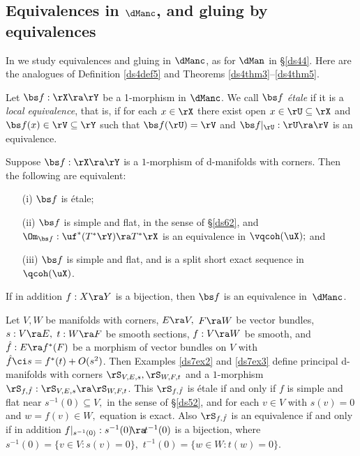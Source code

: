 \documentclass{article}
\begin{document}
\subsection{Equivalences in $\dManc$, and gluing by equivalences}
\label{ds73}

In \cite[\S 7.4]{Joyc6} we study equivalences and gluing in
$\dManc$, as for $\dMan$ in \S\ref{ds44}. Here are the analogues of
Definition \ref{ds4def5} and Theorems
\ref{ds4thm3}--\ref{ds4thm5}.

\begin{dfn} Let $\bs f:\rX\ra\rY$ be a 1-morphism in $\dManc$. We
call $\bs f$ {\it \'etale\/} if it is a {\it local equivalence},
that is, if for each $x\in\rX$ there exist open
$x\in\rU\subseteq\rX$ and $\bs f(x)\in\rV\subseteq\rY$ such that
$\bs f(\rU)=\rV$ and $\bs f\vert_\rU:\rU\ra\rV$ is an equivalence.
\label{ds7def2}
\end{dfn}

\begin{thm} Suppose $\bs f:\rX\ra\rY$ is a $1$-morphism of
d-manifolds with corners. Then the following are equivalent:
\begin{itemize}
\setlength{\itemsep}{0pt}
\setlength{\parsep}{0pt}
\item[{\rm(i)}] $\bs f$ is \'etale;
\item[{\rm(ii)}] $\bs f$ is simple and flat, in the sense of\/
{\rm\S\ref{ds62},} and\/ $\Om_{\bs f}:\uf^* (T^*\rY)\ra T^*\rX$
is an equivalence in $\vqcoh(\uX);$ and
\item[{\rm(iii)}] $\bs f$ is simple and flat, and\/  is
a split short exact sequence
in\/~$\qcoh(\uX)$.
\end{itemize}
If in addition $f:X\ra Y$ is a bijection, then $\bs f$ is an
equivalence in\/~$\dManc$.
\label{ds7thm3}
\end{thm}

\begin{thm} Let\/ $V,W$ be manifolds with corners, $E\ra V,$
$F\ra W$ be vector bundles, $s:V\ra E,$ $t:W\ra F$ be smooth
sections, $f:V\ra W$ be smooth, and\/ $\hat f:E\ra f^*(F)$ be a
morphism of vector bundles on $V$ with\/ $\hat f\ci s=
f^*(t)+O(s^2)$. Then Examples {\rm\ref{ds7ex2}} and\/
{\rm\ref{ds7ex3}} define principal d-manifolds with corners\/
$\rS_{V,E,s},\rS_{W,F,t}$ and a $1$-morphism\/ $\rS_{\smash{f,\hat
f}}:\rS_{V,E,s}\ra\rS_{W,F,t}$. This $\rS_{\smash{f,\hat f}}$ is
\'etale if and only if\/ $f$ is simple and flat near
$s^{-1}(0)\subseteq V,$ in the sense of\/ {\rm\S\ref{ds52},} and for
each\/ $v\in V$ with\/ $s(v)=0$ and\/ $w=f(v)\in W,$ equation
 is exact. Also $\rS_{\smash{f,\hat f}}$ is an
equivalence if and only if in addition\/
$f\vert_{s^{-1}(0)}:s^{-1}(0)\!\ra\! t^{-1}(0)$ is a bijection,
where $s^{-1}(0)\!=\!\{v\in V:s(v)\!=\!0\},$ $t^{-1}(0)\!=\!\{w\in
W:t(w)\!=\!0\}$.
\label{ds7thm4}
\end{thm}
\end{document}
